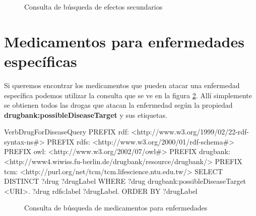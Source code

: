 \documentclass{article}
\begin{document}
\begin{figure}[htbp]
 \fbox
 {
  \begin{minipage}{\textwidth}
   \caption{Consulta de búsqueda de efectos secundarios}
   \label{src:SideEffectQuery}
  \end{minipage}
 }
\end{figure}

\section{Medicamentos para enfermedades específicas}

Si queremos encontrar los medicamentos que pueden atacar una enfermedad
específica podemos utilizar la consulta que se ve en la figura
\ref{src:DrugForDiseaseQuery}. Allí simplemente se obtienen todos las drogas que
atacan la enfermedad según la propiedad {\bf drugbank:possibleDiseaseTarget} y
sus etiquetas.

\begin{SaveVerbatim}{VerbDrugForDiseaseQuery}
PREFIX rdf:  <http://www.w3.org/1999/02/22-rdf-syntax-ns#>
PREFIX rdfs: <http://www.w3.org/2000/01/rdf-schema#>
PREFIX owl:  <http://www.w3.org/2002/07/owl#>
PREFIX drugbank: <http://www4.wiwiss.fu-berlin.de/drugbank/resource/drugbank/>
PREFIX tcm:      <http://purl.org/net/tcm/tcm.lifescience.ntu.edu.tw/>
SELECT DISTINCT ?drug ?drugLabel WHERE {
  ?drug drugbank:possibleDiseaseTarget <URI>.
  ?drug rdfs:label ?drugLabel.
}
ORDER BY ?drugLabel
\end{SaveVerbatim}

\begin{figure}[htbp]
 \fbox
 {
  \begin{minipage}{\textwidth}
   \caption{Consulta de búsqueda de medicamentos para enfermedades}
   \label{src:DrugForDiseaseQuery}
  \end{minipage}
 }
\end{figure}
\end{document}
